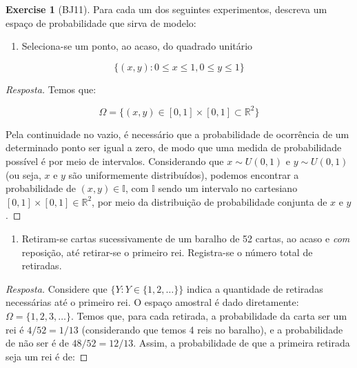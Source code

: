 \documentclass[
]{article}
\providecommand{\tightlist}{%
  \setlength{\itemsep}{0pt}\setlength{\parskip}{0pt}}
\theoremstyle{definition}
\theoremstyle{definition}
\theoremstyle{definition}
\newtheorem{exercise}{Exercise}[section]
\theoremstyle{definition}
\theoremstyle{remark}
\begin{document}
\begin{exercise}[BJ11]

Para cada um dos seguintes experimentos, descreva um espaço de probabilidade que sirva de modelo:

\begin{enumerate}
\def\labelenumi{\alph{enumi})}
\tightlist
\item
  Seleciona-se um ponto, ao acaso, do quadrado unitário
\end{enumerate}

\begin{equation*}
\{(x,y) : 0 \le x \le 1, 0 \le y \le 1\}
\end{equation*}

\begin{proof}[Resposta]
Temos que:

\begin{equation*}
\Omega = \{(x,y) \in [0,1] \times [0,1] \subset \mathbb{R}^{2}\}
\end{equation*}

Pela continuidade no vazio, é necessário que a probabilidade de ocorrência de um determinado ponto ser igual a zero, de modo que uma medida de probabilidade possível é por meio de intervalos. Considerando que \(x \sim U(0,1)\) e \(y \sim U(0,1)\) (ou seja, \(x\) e \(y\) são uniformemente distribuídos), podemos encontrar a probabilidade de \((x,y) \in \mathbb{I}\), com \(\mathbb{I}\) sendo um intervalo no cartesiano \([0,1] \times [0,1] \in \mathbb{R}^{2}\), por meio da distribuição de probabilidade conjunta de \(x\) e \(y\).
\end{proof}

\begin{enumerate}
\def\labelenumi{\alph{enumi})}
\setcounter{enumi}{1}
\tightlist
\item
  Retiram-se cartas sucessivamente de um baralho de 52 cartas, ao acaso e \emph{com} reposição, até retirar-se o primeiro rei. Registra-se o número total de retiradas.
\end{enumerate}

\begin{proof}[Resposta]
Considere que \(\{Y: Y \in \{1,2,\dots\}\}\) indica a quantidade de retiradas necessárias até o primeiro rei. O espaço amostral é dado diretamente: \(\Omega = \{1,2,3,\dots\}\). Temos que, para cada retirada, a probabilidade da carta ser um rei é \(4/52 = 1/13\) (considerando que temos 4 reis no baralho), e a probabilidade de não ser é de \(48/52 = 12/13\). Assim, a probabilidade de que a primeira retirada seja um rei é de:


\end{proof}
\end{exercise}
\end{document}
